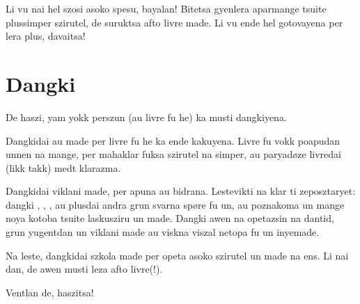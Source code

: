 Li vu nai hel szosi asoko spesu, bayalan! Bitetsa gyenlera aparmange tsuite
plussimper szirutel, de suruktsa afto livre made. Li vu ende hel gotovayena
per lera plus, davaitsa!


\section{Dangki}
De haszi, yam yokk perszun (au livre fu he) ka musti dangkiyena.

Dangkidai  au  made per livre fu he
ka ende kakuyena. Livre fu vokk poapudan unnen na mange, per mahaklar
fuksa szirutel na simper, au paryadøze livredai (likk takk) medt klarazma.

Dangkidai  viklani made, per apuna au bidrana. Lestevikti na
klar ti  zeposztaryet: dangki , ,
, au plusdai andra grun svarna spøre fu un, au poznakoma un
mange noya kotoba tsuite laskusziru un made. Dangki awen na  opetazsin na
dantid, grun yugentdan un viklani made au viskna viszal netopa fu un inyemade.

Na leste, dangkidai szkola made per opeta asoko szirutel un made na ens. Li nai dan,
de awen musti leza afto livre(!).

\begin{center}
  Ventlan de, haszitsa!
\end{center}
